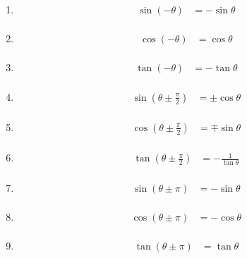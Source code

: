 \begin{Theorem}[$B;03Q4X?t$N<~4|@-(B]
\ \\ \par
\begin{enumerate}
\item
\begin{align}
\begin{split}
\sin (-\theta) &=  - \sin \theta
\end{split}
\end{align}
\item
\begin{align}
\begin{split}
\cos ( - \theta) &= \cos \theta
\end{split}
\end{align}
\item
\begin{align}
\begin{split}
\tan(- \theta) &= -\tan \theta
\end{split}
\end{align}
\item
\begin{align}
\begin{split}
\sin \left( \theta \pm \frac{\pi}{2} \right) &= \pm \cos \theta
\end{split}
\end{align}
\item
\begin{align}
\begin{split}
\cos \left( \theta \pm \frac{\pi}{2} \right) &= \mp \sin \theta
\end{split}
\end{align}
\item
\begin{align}
\begin{split}
\tan \left( \theta \pm \frac{\pi}{2} \right) &= - \frac{1}{\tan \theta}
\end{split}
\end{align}
\item
\begin{align}
\begin{split}
\sin \left( \theta \pm \pi \right) &= - \sin \theta
\end{split}
\end{align}
\item
\begin{align}
\begin{split}
\cos \left( \theta \pm \pi \right) &= - \cos \theta
\end{split}
\end{align}
\item
\begin{align}
\begin{split}
\tan \left( \theta \pm \pi \right) &= \tan \theta
\end{split}
\end{align}
\end{enumerate}
\end{Theorem}

